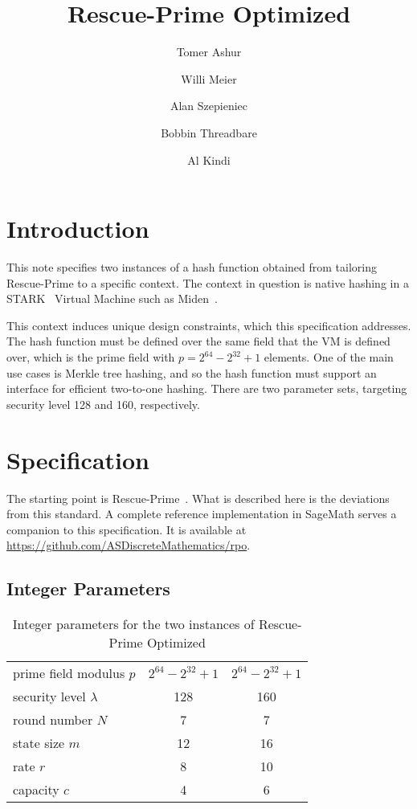 \documentclass[a4paper]{article}
\title{Rescue-Prime Optimized}
\author{Tomer Ashur \and Willi Meier \and Alan Szepieniec \and Bobbin Threadbare \and Al Kindi}
\begin{document}
\maketitle

\section{Introduction}

This note specifies two instances of a hash function obtained from tailoring Rescue-Prime to a specific context. The context in question is native hashing in a STARK~\cite{cryptoeprint:2018/046} Virtual Machine such as Miden~\cite{miden}.

This context induces unique design constraints, which this specification addresses. The hash function must be defined over the same field that the VM is defined over, which is the prime field with  $p = 2^{64} - 2^{32} + 1$ elements. One of the main use cases is Merkle tree hashing, and so the hash function must support an interface for efficient two-to-one hashing. There are two parameter sets, targeting security level 128 and 160, respectively. 

\section{Specification}

The starting point is Rescue-Prime~\cite{cryptoeprint:2020/1143}. What is described here is the deviations from this standard. A complete reference implementation in SageMath serves a companion to this specification. It is available at \url{https://github.com/ASDiscreteMathematics/rpo}.

\subsection{Integer Parameters}

\begin{table}[!htp]
\centering
\caption{Integer parameters for the two instances of Rescue-Prime Optimized}
\label{table:integer-parameters}

\begin{tabular}{l||c|c}
prime field modulus $p$ & $2^{64} - 2^{32} + 1$ & $2^{64} - 2^{32} + 1$ \\
security level $\lambda$ & 128 & 160 \\
round number $N$ & 7 & 7 \\
state size $m$ & 12 & 16 \\
rate $r$ & 8 & 10 \\
capacity $c$ & 4 & 6 \\
\end{tabular}
\end{table}
\end{document}
